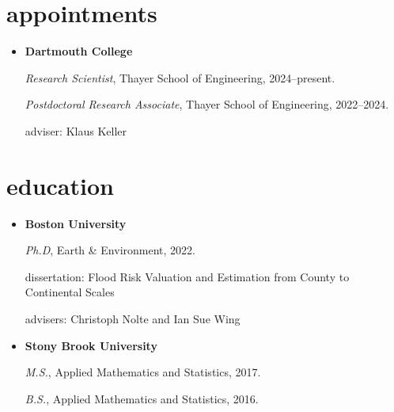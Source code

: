 \documentclass[10pt,oneside]{article}
\begin{document}

\section{appointments}

\mbox{}\vspace{-\dimexpr\baselineskip\relax}

\begin{itemize}[label={}]
  
  \item \textbf{Dartmouth College}
        
        \textit{Research Scientist}, Thayer School of Engineering, 2024--present.
        
        
        \textit{Postdoctoral Research Associate}, Thayer School of Engineering, 2022--2024.
        
        adviser: Klaus Keller
        
        
        
\end{itemize}


\section{education}

\mbox{}\vspace{-\dimexpr\baselineskip\relax}

\begin{itemize}[label={}]
  
  \item \textbf{Boston University}
        
        \textit{Ph.D}, Earth \& Environment, 2022.
        
        
        dissertation: Flood Risk Valuation and Estimation from County to Continental Scales
        
        advisers: Christoph Nolte and Ian Sue Wing
        
        
  \item \textbf{Stony Brook University}
        
        \textit{M.S.}, Applied Mathematics and Statistics, 2017.
        
        \textit{B.S.}, Applied Mathematics and Statistics, 2016.
        
        
        
\end{itemize}
\end{document}
